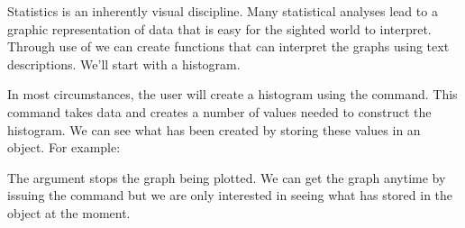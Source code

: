Statistics is an inherently visual discipline. Many statistical analyses lead to a graphic representation of data that is easy for the sighted world to interpret. Through use of \R{} we can create functions that can interpret the graphs using text descriptions. We'll start with a histogram.  
 
In most circumstances, the user will create a histogram using the  command. This command takes data and creates a number of values needed to construct the histogram. We can see what has been created by storing these values in an object. For example: 

\begin{Schunk}
\end{Schunk}

The  argument stops the graph being plotted. We can get the graph anytime by issuing the  command but we are only interested in seeing what \R{} has stored in the  object at the moment.  

